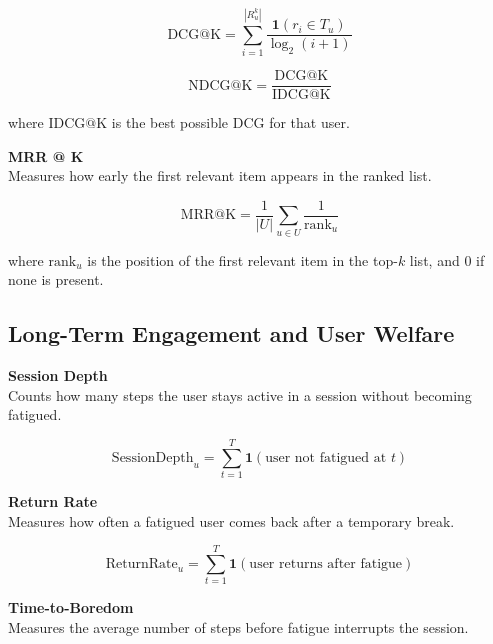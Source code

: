 \begin{equation}
    \mathrm{DCG@K}=\sum_{i=1}^{|R_u^k|}\frac{\mathbf{1}(r_i\in T_u)}{\log_2(i+1)}
\end{equation}

\begin{equation}
    \mathrm{NDCG@K}=\frac{\mathrm{DCG@K}}{\mathrm{IDCG@K}}
\end{equation}

where $\mathrm{IDCG@K}$ is the best possible DCG for that user.


\noindent \textbf{MRR @ K} \\
Measures how early the first relevant item appears in the ranked list.

\begin{equation}
    \mathrm{MRR@K}=\frac{1}{|U|}\sum_{u\in U}\frac{1}{\mathrm{rank}_u}
\end{equation}

where $\mathrm{rank}_u$ is the position of the first relevant item in the top-$k$ list, and $0$ if none is present. 



\subsection{Long-Term Engagement and User Welfare}


\noindent \textbf{Session Depth} \\
Counts how many steps the user stays active in a session without becoming fatigued.

\begin{equation}
    \mathrm{SessionDepth}_u=\sum_{t=1}^{T}\mathbf{1}(\text{user not fatigued at } t)
\end{equation}


\noindent \textbf{Return Rate} \\
Measures how often a fatigued user comes back after a temporary break.

\begin{equation}
    \mathrm{ReturnRate}_u=\sum_{t=1}^{T}\mathbf{1}(\text{user returns after fatigue})
\end{equation}


\noindent \textbf{Time-to-Boredom} \\
Measures the average number of steps before fatigue interrupts the session.

